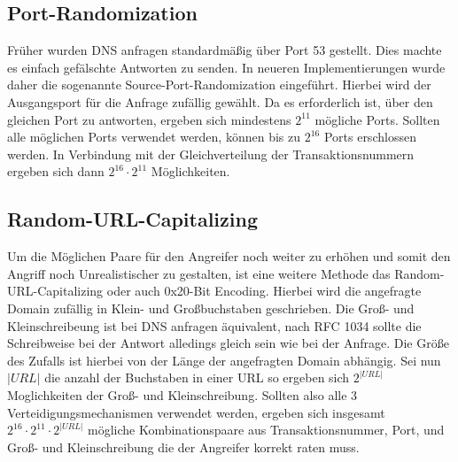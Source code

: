 \documentclass[10pt,a4paper]{article}
\begin{document}
\subsection*{Port-Randomization}
Früher wurden DNS anfragen standardmäßig über Port 53 gestellt. Dies machte es einfach gefälschte Antworten zu senden. In neueren Implementierungen wurde daher die sogenannte Source-Port-Randomization eingeführt. Hierbei wird der Ausgangsport für die Anfrage zufällig gewählt. Da es erforderlich ist, über den gleichen Port zu antworten, ergeben sich mindestens $2^{11}$ mögliche Ports. Sollten alle möglichen Ports verwendet werden, können bis zu $2^{16}$ Ports erschlossen werden. In Verbindung mit der Gleichverteilung der Transaktionsnummern ergeben sich dann $2^{16} \cdot 2^{11}$ Möglichkeiten.

\subsection*{Random-URL-Capitalizing}
Um die Möglichen Paare für den Angreifer noch weiter zu erhöhen und somit den Angriff noch Unrealistischer zu gestalten, ist eine weitere Methode das Random-URL-Capitalizing oder auch 0x20-Bit Encoding. Hierbei wird die angefragte Domain zufällig in Klein- und Großbuchstaben geschrieben. Die Groß- und Kleinschreibeung ist bei DNS anfragen äquivalent, nach RFC 1034 sollte die Schreibweise bei der Antwort alledings gleich sein wie bei der Anfrage. Die Größe des Zufalls ist hierbei von der Länge der angefragten Domain abhängig. Sei nun $|\mathit{URL}|$ die anzahl der Buchstaben in einer URL so ergeben sich $2^{|URL|}$ Moglichkeiten der Groß- und Kleinschreibung. Sollten also alle 3 Verteidigungsmechanismen verwendet werden, ergeben sich insgesamt $2^{16} \cdot 2^{11} \cdot 2^{|URL|}$ mögliche Kombinationspaare aus Transaktionsnummer, Port, und Groß- und Kleinschreibung die der Angreifer korrekt raten muss.



\end{document}

